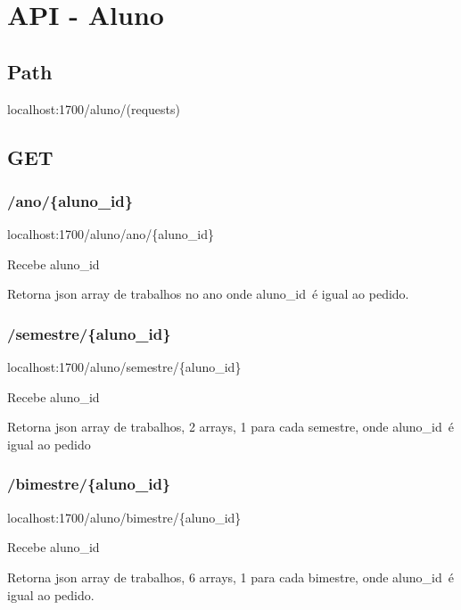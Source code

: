 \documentclass[../main.tex]{subfiles}
\begin{document}
\section{API - Aluno}

\subsection{Path}
localhost:1700/aluno/(requests)

\subsection{GET}
\subsubsection{/ano/\{aluno\_id\}}
localhost:1700/aluno/ano/\{aluno\_id\} \par

Recebe aluno\_id\ \par
Retorna json array de trabalhos no ano onde aluno\_id\ é igual ao pedido. \newline

\subsubsection{/semestre/\{aluno\_id\}}
localhost:1700/aluno/semestre/\{aluno\_id\} \par

Recebe aluno\_id\ \par
Retorna json array de trabalhos, 2 arrays, 1 para cada semestre, onde aluno\_id\ é igual ao pedido \newline

\subsubsection{/bimestre/\{aluno\_id\}}
localhost:1700/aluno/bimestre/\{aluno\_id\} \par

Recebe aluno\_id\ \par
Retorna json array de trabalhos, 6 arrays, 1 para cada bimestre, onde aluno\_id\ é igual ao pedido. \newline
\end{document}
